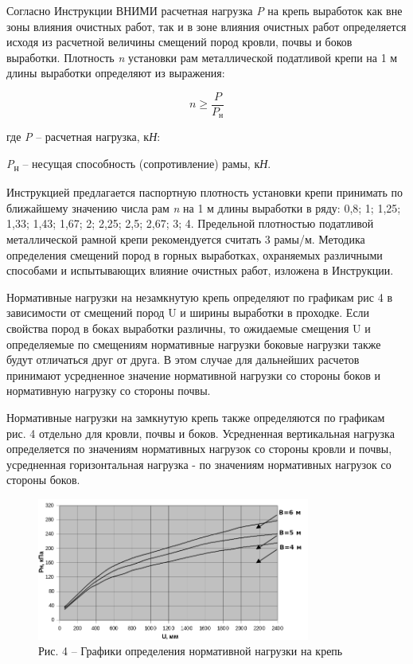 \begin{multicols}{2}
Согласно Инструкции ВНИМИ расчетная нагрузка \emph{P} на крепь выработок
как вне зоны влияния очистных работ, так и в зоне влияния очистных работ
определяется исходя из расчетной величины смещений пород кровли, почвы и
боков выработки. Плотность \emph{n} установки рам металлической
податливой крепи на 1 м длины выработки определяют из выражения:

\begin{equation}
n \geq \frac{P}{P_{\text{н}}}
\end{equation}

где \emph{P} -- расчетная нагрузка, к\emph{Н}:

\emph{P}\textsubscript{н} -- несущая способность (сопротивление) рамы,
к\emph{Н}.

Инструкцией предлагается паспортную плотность установки крепи принимать
по ближайшему значению числа рам \emph{n} на 1 м длины выработки в ряду:
0,8; 1; 1,25; 1,33; 1,43; 1,67; 2; 2,25; 2,5; 2,67; 3; 4. Предельной
плотностью податливой металлической рамной крепи рекомендуется считать 3
рамы/м. Методика определения смещений пород в горных выработках,
охраняемых различными способами и испытывающих влияние очистных работ,
изложена в Инструкции.

Нормативные нагрузки на незамкнутую крепь определяют по графикам рис 4 в
зависимости от смещений пород U и ширины выработки в проходке. Если
свойства пород в боках выработки различны, то ожидаемые смещения U и
определяемые по смещениям нормативные нагрузки боковые нагрузки также
будут отличаться друг от друга. В этом случае для дальнейших расчетов
принимают усредненное значение нормативной нагрузки со стороны боков и
нормативную нагрузку со стороны почвы.

Нормативные нагрузки на замкнутую крепь также определяются по графикам
рис. 4 отдельно для кровли, почвы и боков. Усредненная вертикальная
нагрузка определяется по значениям нормативных нагрузок со стороны
кровли и почвы, усредненная горизонтальная нагрузка - по значениям
нормативных нагрузок со стороны боков.
\end{multicols}

\begin{figure}[H]
	\centering
	\includegraphics[width=0.8\textwidth]{assets/1360}
	\caption*{Рис. 4 -- Графики определения нормативной нагрузки на крепь}
\end{figure}

